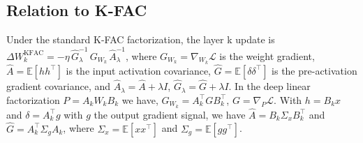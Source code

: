 \documentclass{article}
\newcommand{\note}{\textcolor{blue}}
\begin{document}
\subsection{Relation to K-FAC}
\label{sec:kfac}
Under the standard K-FAC factorization, the layer k update is
$  \Delta W_k^{\mathrm{KFAC}}
  = -\eta\, \hat G_\lambda^{-1}\, G_{W_k}\, \hat A_\lambda^{-1}$,
where $G_{W_k} = \nabla_{W_k}\mathcal{L}$ is the weight gradient,
$\hat A = \mathbb{E}[hh^\top]$ is the input activation covariance,
$\hat G = \mathbb{E}[\delta\delta^\top]$ is the pre-activation gradient
covariance, and $\hat A_\lambda = \hat A + \lambda I$,
$\hat G_\lambda = \hat G + \lambda I$.
In the deep linear factorization $P = A_k W_k B_k$ we have,
$G_{W_k} = A_k^\top G B_k^\top$, $G = \nabla_ P \mathcal{L}$.
With $h = B_k x$ and $\delta = A_k^\top g$ with $g$ the output gradient signal, we have $\hat A = B_k \Sigma_x B_k^\top$ and
$\hat G = A_k^\top \Sigma_g A_k$, where $\Sigma_x = \mathbb{E}[xx^\top]$ and
$\Sigma_g = \mathbb{E}[g g^\top]$.
\end{document}
